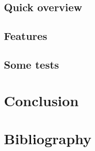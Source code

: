 \documentclass[a4paper,11pt]{article}
\begin{document}
\subsection{Quick overview}
\subsection{Features}
\subsection{Some tests}
    


\section*{Conclusion}


\clearpage
\section*{Bibliography}
\end{document}
